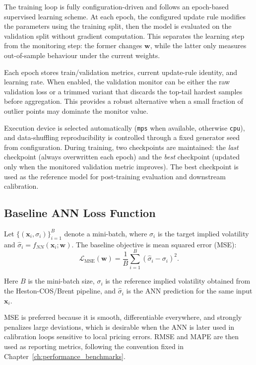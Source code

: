 The training loop is fully configuration-driven and follows an epoch-based supervised learning scheme. At each epoch, the configured update rule modifies the parameters using the training split, then the model is evaluated on the validation split without gradient computation. This separates the learning step from the monitoring step: the former changes \(\mathbf{w}\), while the latter only measures out-of-sample behaviour under the current weights.

Each epoch stores train/validation metrics, current update-rule identity, and learning rate. When enabled, the validation monitor can be either the raw validation loss or a trimmed variant that discards the top-tail hardest samples before aggregation. This provides a robust alternative when a small fraction of outlier points may dominate the monitor value.

Execution device is selected automatically (\texttt{mps} when available, otherwise \texttt{cpu}), and data-shuffling reproducibility is controlled through a fixed generator seed from configuration. During training, two checkpoints are maintained: the \textit{last} checkpoint (always overwritten each epoch) and the \textit{best} checkpoint (updated only when the monitored validation metric improves). The best checkpoint is used as the reference model for post-training evaluation and downstream calibration.

\subsection{Baseline ANN Loss Function}
Let $\{(\mathbf{x}_i,\sigma_i)\}_{i=1}^{B}$ denote a mini-batch, where $\sigma_i$ is the target implied volatility and $\hat{\sigma}_i=f_{NN}(\mathbf{x}_i;\mathbf{w})$. The baseline objective is mean squared error (MSE):
\begin{equation}
\label{eq:ann_baseline_mse_loss}
\mathcal{L}_{\text{MSE}}(\mathbf{w})=\frac{1}{B}\sum_{i=1}^{B}\left(\hat{\sigma}_i-\sigma_i\right)^2.
\end{equation}

Here \(B\) is the mini-batch size, \(\sigma_i\) is the reference implied volatility obtained from the Heston-COS/Brent pipeline, and \(\hat{\sigma}_i\) is the ANN prediction for the same input \(\mathbf{x}_i\).

MSE is preferred because it is smooth, differentiable everywhere, and strongly penalizes large deviations, which is desirable when the ANN is later used in calibration loops sensitive to local pricing errors. RMSE and MAPE are then used as reporting metrics, following the convention fixed in Chapter~\ref{ch:performance_benchmarks}.

